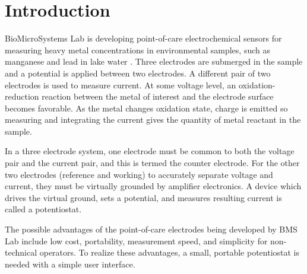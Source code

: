 \documentclass[
10pt, %
a4paper, %
oneside, %
headinclude,footinclude, %
BCOR5mm, %
]{scrartcl}
\begin{document}




\newpage %


\section{Introduction}

BioMicroSystems Lab is developing point-of-care electrochemical sensors for measuring heavy metal concentrations in environmental samples,
such as manganese and lead in lake water \cite{Figueredo:2009dg}.
Three electrodes are submerged in the sample and a potential is applied between two electrodes.
A different pair of two electrodes is used to measure current.
At some voltage level, an oxidation-reduction reaction between the metal of interest and the electrode surface becomes favorable.
As the metal changes oxidation state, charge is emitted so measuring and integrating the current gives the quantity of metal reactant in the sample.

In a three electrode system, one electrode must be common to both the voltage pair and the current pair,
and this is termed the counter electrode.
For the other two electrodes (reference and working) to accurately separate voltage and current,
they must be virtually grounded by amplifier electronics.
A device which drives the virtual ground, sets a potential, and measures resulting current is called a potentiostat.

The possible advantages of the point-of-care electrodes being developed by BMS Lab include
low cost, portability, measurement speed, and simplicity for non-technical operators.
To realize these advantages, a small, portable potentiostat is needed with a simple user interface.
 
\end{document}
